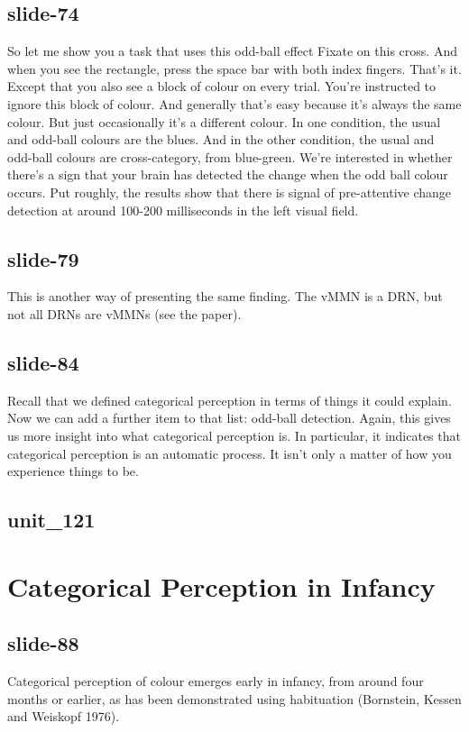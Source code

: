 \documentclass[12pt,\papersize]{extarticle}
\begin{document}
\subsection{slide-74}
So let me show you a task that uses this odd-ball effect
Fixate on this cross.
And when you see the rectangle, press the space bar with both index fingers.
That's it.
Except that you also see a block of colour on every trial.
You're instructed to ignore this block of colour.
And generally that's easy because it's always the same colour.
But just occasionally it's a different colour.
In one condition, the usual and odd-ball colours are the blues.
And in the other condition, the usual and odd-ball colours are cross-category, from blue-green.
We're interested in whether there's a sign that your brain has detected the change when the odd ball colour occurs.
Put roughly, the results show that there is signal of pre-attentive change detection at around 100-200 milliseconds in the left visual field.
 
 
\subsection{slide-79}
This is another way of presenting the same finding.
The vMMN is a DRN, but not all DRNs are vMMNs (see the paper).
 
 
\subsection{slide-84}
Recall that we defined categorical perception in terms of things it could explain.
Now we can add a further item to that list: odd-ball detection.
Again, this gives us more insight into what categorical perception is.
In particular, it indicates that categorical perception is an automatic process.
It isn't only a matter of how you experience things to be.
 
 
\subsection{unit\_121}
 
\section{Categorical Perception in Infancy}
 
 
\subsection{slide-88}
Categorical perception of colour emerges early in infancy, from around four months or earlier, as has been demonstrated using habituation (Bornstein, Kessen and Weiskopf 1976).
 
\end{document}

